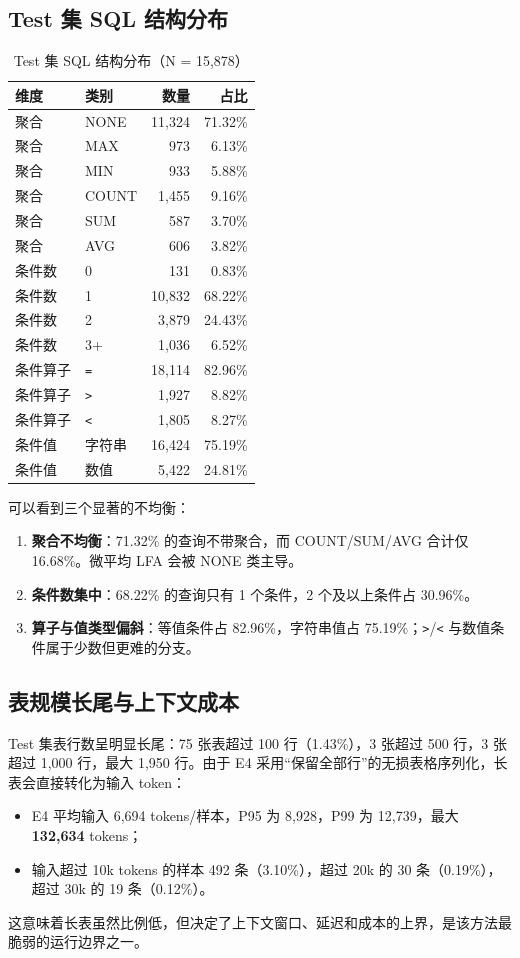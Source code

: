 \documentclass[conference]{IEEEtran}
\begin{document}
\subsection{Test 集 SQL 结构分布}
\begin{table}[t]
\centering
\footnotesize
\caption{Test 集 SQL 结构分布（N = 15,878）}
\label{tab:t2}
\begin{tabular}{@{}llrr@{}}
\toprule
维度 & 类别 & 数量 & 占比 \\
\midrule
聚合 & NONE & 11,324 & 71.32\% \\
聚合 & MAX & 973 & 6.13\% \\
聚合 & MIN & 933 & 5.88\% \\
聚合 & COUNT & 1,455 & 9.16\% \\
聚合 & SUM & 587 & 3.70\% \\
聚合 & AVG & 606 & 3.82\% \\
条件数 & 0 & 131 & 0.83\% \\
条件数 & 1 & 10,832 & 68.22\% \\
条件数 & 2 & 3,879 & 24.43\% \\
条件数 & 3+ & 1,036 & 6.52\% \\
条件算子 & \texttt{=} & 18,114 & 82.96\% \\
条件算子 & \texttt{\textgreater{}} & 1,927 & 8.82\% \\
条件算子 & \texttt{\textless{}} & 1,805 & 8.27\% \\
条件值 & 字符串 & 16,424 & 75.19\% \\
条件值 & 数值 & 5,422 & 24.81\% \\
\bottomrule
\end{tabular}
\end{table}
可以看到三个显著的不均衡：
\begin{enumerate}
\item \textbf{聚合不均衡}：71.32\% 的查询不带聚合，而 COUNT/SUM/AVG 合计仅 16.68\%。微平均 LFA 会被 NONE 类主导。
\item \textbf{条件数集中}：68.22\% 的查询只有 1 个条件，2 个及以上条件占 30.96\%。
\item \textbf{算子与值类型偏斜}：等值条件占 82.96\%，字符串值占 75.19\%；\texttt{\textgreater{}}/\texttt{\textless{}} 与数值条件属于少数但更难的分支。
\end{enumerate}
\subsection{表规模长尾与上下文成本}
Test 集表行数呈明显长尾：75 张表超过 100 行（1.43\%），3 张超过 500 行，3 张超过 1,000 行，最大 1,950 行。由于 E4 采用“保留全部行”的无损表格序列化，长表会直接转化为输入 token：
\begin{itemize}
\item E4 平均输入 6,694 tokens/样本，P95 为 8,928，P99 为 12,739，最大 \textbf{132,634} tokens；
\item 输入超过 10k tokens 的样本 492 条（3.10\%），超过 20k 的 30 条（0.19\%），超过 30k 的 19 条（0.12\%）。
\end{itemize}
这意味着长表虽然比例低，但决定了上下文窗口、延迟和成本的上界，是该方法最脆弱的运行边界之一。
\end{document}
